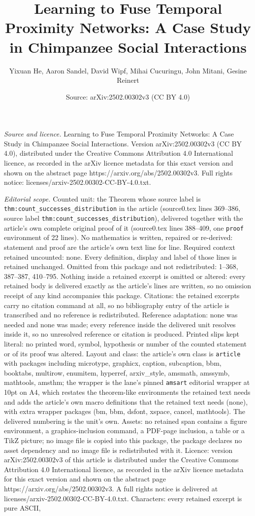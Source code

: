 \documentclass[10pt,a4paper]{amsart}
\title[Learning to Fuse Temporal Proximity Networks: A Case Study i]{Learning to Fuse Temporal Proximity Networks: A Case Study in Chimpanzee Social Interactions}
\author{Yixuan He, Aaron Sandel, David Wipf, Mihai Cucuringu, John Mitani, Gesine Reinert}
\date{Source: arXiv:2502.00302v3 (CC BY 4.0)}
\begin{document}
\maketitle

\noindent\emph{Source and licence.} Learning to Fuse Temporal Proximity Networks: A Case Study in Chimpanzee Social Interactions. Version arXiv:2502.00302v3 (CC BY 4.0), distributed under the Creative Commons Attribution 4.0 International licence, as recorded in the arXiv licence metadata for this exact version and shown on the abstract page https://arxiv.org/abs/2502.00302v3. Full rights notice: licenses/arxiv-2502.00302-CC-BY-4.0.txt.\par\smallskip

\noindent\textit{Editorial scope.} Counted unit: the Theorem whose source label is \texttt{thm:count\_successes\_distribution} in the article (source0.tex lines 369--386, source label \texttt{thm:count\_successes\_distribution}), delivered together with the article's own complete original proof of it (source0.tex lines 388--409, one \texttt{proof} environment of 22 lines). No mathematics is written, repaired or re-derived: statement and proof are the article's own text line for line. Required context retained uncounted: none. Every definition, display and label of those lines is retained unchanged. Omitted from this package and not redistributed: 1--368, 387--387, 410--795. Nothing inside a retained excerpt is omitted or altered: every retained body is delivered exactly as the article's lines are written, so no omission receipt of any kind accompanies this package. Citations: the retained excerpts carry no citation command at all, so no bibliography entry of the article is transcribed and no reference is redistributed. Reference adaptation: none was needed and none was made; every reference inside the delivered unit resolves inside it, so no unresolved reference or citation is produced. Printed slips kept literal: no printed word, symbol, hypothesis or number of the counted statement or of its proof was altered. Layout and class: the article's own class is \texttt{article} with packages including microtype, graphicx, caption, subcaption, bbm, booktabs, multirow, enumitem, hyperref, arxiv\_style, amsmath, amssymb, mathtools, amsthm; the wrapper is the lane's pinned \texttt{amsart} editorial wrapper at 10pt on A4, which restates the theorem-like environments the retained text needs and adds the article's own macro definitions that the retained text needs (none), with extra wrapper packages (bm, bbm, dsfont, xspace, cancel, mathtools). The delivered numbering is the unit's own. Assets: no retained span contains a figure environment, a graphics-inclusion command, a PDF-page inclusion, a table or a TikZ picture; no image file is copied into this package, the package declares no asset dependency and no image file is redistributed with it. Licence: version arXiv:2502.00302v3 of this article is distributed under the Creative Commons Attribution 4.0 International licence, as recorded in the arXiv licence metadata for this exact version and shown on the abstract page https://arxiv.org/abs/2502.00302v3. A full rights notice is delivered at licenses/arxiv-2502.00302-CC-BY-4.0.txt. Characters: every retained excerpt is pure ASCII, 
\end{document}
